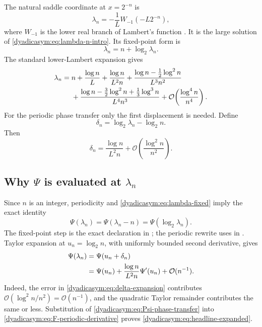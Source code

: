 \documentclass[11pt,oneside]{article}
\theoremstyle{definition}
\theoremstyle{remark}
\newcommand{\bigO}{\mathcal O}
\begin{document}
The natural saddle coordinate at $x=2^{-n}$ is
\begin{equation}
 \lambda_n=-\frac1L W_{-1}(-L2^{-n}),                       \label{dyadicasym:eq:lambda-W}
\end{equation}
where $W_{-1}$ is the lower real branch of Lambert's function
\cite{dyadicasym:corless1996}.  It is the large solution of \eqref{dyadicasym:eq:lambda-n-intro}.  Its fixed-point
form is
\begin{equation}
 \lambda_n=n+\log_2\lambda_n.                               \label{dyadicasym:eq:lambda-fixed}
\end{equation}
The standard lower-Lambert expansion gives
\begin{align}
 \lambda_n={}&n+\frac{\log n}{L}+\frac{\log n}{L^2n}
 +\frac{\log n-\tfrac12\log^2n}{L^3n^2}                    \notag\\
 &+\frac{\log n-\tfrac32\log^2n+\tfrac13\log^3n}{L^4n^3}
 +\bigO\!\left(\frac{\log^4n}{n^4}\right).               \label{dyadicasym:eq:lambda-expansion}
\end{align}
For the periodic phase transfer only the first displacement is needed.  Define
\begin{equation}
 \delta_n=\log_2\lambda_n-\log_2n.                          \label{dyadicasym:eq:delta}
\end{equation}
Then
\begin{equation}
 \delta_n=\frac{\log n}{L^2n}
 +\bigO\!\left(\frac{\log^2n}{n^2}\right).                \label{dyadicasym:eq:delta-expansion}
\end{equation}

\subsection{Why \texorpdfstring{$\Psi$}{Psi} is evaluated at \texorpdfstring{$\lambda_n$}{lambda n}}

Since $n$ is an integer, periodicity and \eqref{dyadicasym:eq:lambda-fixed} imply the exact identity
\begin{equation}
 \Psi(\lambda_n)=\Psi(\lambda_n-n)
 =\Psi(\log_2\lambda_n).                                   \label{dyadicasym:eq:Psi-lambda-exact}
\end{equation}
The fixed-point step is the exact declaration
 in ; the periodic rewrite
uses  in .
Taylor expansion at $u_n=\log_2n$, with uniformly bounded second derivative, gives
\begin{align}
 \Psi(\lambda_n)
 &=\Psi(u_n+\delta_n)                                      \notag\\
 &=\Psi(u_n)+\frac{\log n}{L^2n}\Psi'(u_n)
   +\bigO(n^{-1}).                                          \label{dyadicasym:eq:Psi-phase-transfer}
\end{align}
Indeed, the error in \eqref{dyadicasym:eq:delta-expansion} contributes
$\bigO(\log^2n/n^2)=\bigO(n^{-1})$, and the quadratic Taylor remainder contributes the same
or less.  Substitution of \eqref{dyadicasym:eq:Psi-phase-transfer} into
\eqref{dyadicasym:eq:F-periodic-derivative} proves \eqref{dyadicasym:eq:headline-expanded}.
\end{document}
